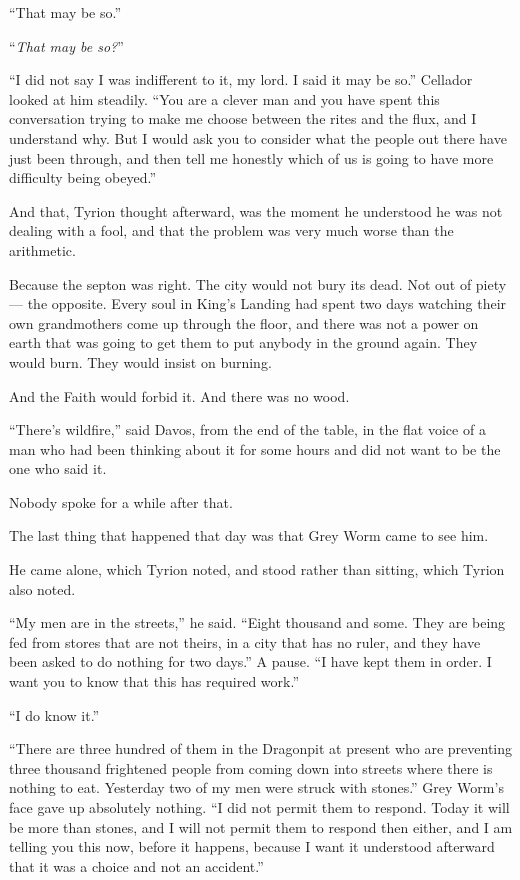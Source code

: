 “That may be so.”

“\textit{That may be so?}”

“I did not say I was indifferent to it, my lord. I said it may be so.” Cellador looked at him steadily. “You are a clever man and you have spent this conversation trying to make me choose between the rites and the flux, and I understand why. But I would ask you to consider what the people out there have just been through, and then tell me honestly which of us is going to have more difficulty being obeyed.”

And that, Tyrion thought afterward, was the moment he understood he was not dealing with a fool, and that the problem was very much worse than the arithmetic.

Because the septon was right. The city would not bury its dead. Not out of piety — the opposite. Every soul in King’s Landing had spent two days watching their own grandmothers come up through the floor, and there was not a power on earth that was going to get them to put anybody in the ground again. They would burn. They would insist on burning.

And the Faith would forbid it. And there was no wood.

“There’s wildfire,” said Davos, from the end of the table, in the flat voice of a man who had been thinking about it for some hours and did not want to be the one who said it.

Nobody spoke for a while after that.

\sceneBreak

The last thing that happened that day was that Grey Worm came to see him.

He came alone, which Tyrion noted, and stood rather than sitting, which Tyrion also noted.

“My men are in the streets,” he said. “Eight thousand and some. They are being fed from stores that are not theirs, in a city that has no ruler, and they have been asked to do nothing for two days.” A pause. “I have kept them in order. I want you to know that this has required work.”

“I do know it.”

“There are three hundred of them in the Dragonpit at present who are preventing three thousand frightened people from coming down into streets where there is nothing to eat. Yesterday two of my men were struck with stones.” Grey Worm’s face gave up absolutely nothing. “I did not permit them to respond. Today it will be more than stones, and I will not permit them to respond then either, and I am telling you this now, before it happens, because I want it understood afterward that it was a choice and not an accident.”

